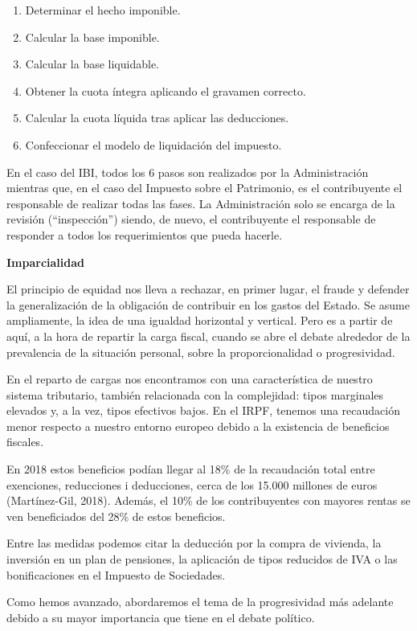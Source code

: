 \documentclass[
]{article}
\begin{document}
\begin{enumerate}
\def\labelenumi{\arabic{enumi}.}
\item
  Determinar el hecho imponible.
\item
  Calcular la base imponible.
\item
  Calcular la base liquidable.
\item
  Obtener la cuota íntegra aplicando el gravamen correcto.
\item
  Calcular la cuota líquida tras aplicar las deducciones.
\item
  Confeccionar el modelo de liquidación del impuesto.
\end{enumerate}

En el caso del IBI, todos los 6 pasos son realizados por la
Administración mientras que, en el caso del Impuesto sobre el
Patrimonio, es el contribuyente el responsable de realizar todas las
fases. La Administración solo se encarga de la revisión (``inspección'')
siendo, de nuevo, el contribuyente el responsable de responder a todos
los requerimientos que pueda hacerle.

\textbf{Imparcialidad}

El principio de equidad nos lleva a rechazar, en primer lugar, el fraude
y defender la generalización de la obligación de contribuir en los
gastos del Estado. Se asume ampliamente, la idea de una igualdad
horizontal y vertical. Pero es a partir de aquí, a la hora de repartir
la carga fiscal, cuando se abre el debate alrededor de la prevalencia de
la situación personal, sobre la proporcionalidad o progresividad.

En el reparto de cargas nos encontramos con una característica de
nuestro sistema tributario, también relacionada con la complejidad:
tipos marginales elevados y, a la vez, tipos efectivos bajos. En el
IRPF, tenemos una recaudación menor respecto a nuestro entorno europeo
debido a la existencia de beneficios fiscales.

En 2018 estos beneficios podían llegar al 18\% de la recaudación total
entre exenciones, reducciones i deducciones, cerca de los 15.000
millones de euros (Martínez-Gil, 2018). Además, el 10\% de los
contribuyentes con mayores rentas se ven beneficiados del 28\% de estos
beneficios.

Entre las medidas podemos citar la deducción por la compra de vivienda,
la inversión en un plan de pensiones, la aplicación de tipos reducidos
de IVA o las bonificaciones en el Impuesto de Sociedades.

Como hemos avanzado, abordaremos el tema de la progresividad más
adelante debido a su mayor importancia que tiene en el debate político.
\end{document}
